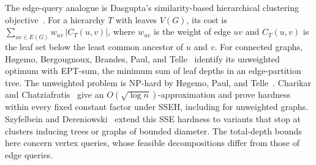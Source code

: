 The edge-query analogue is Dasgupta's similarity-based hierarchical
clustering objective~\cite{Dasgupta2016}. For a hierarchy $T$ with
leaves $V(G)$, its cost is
$\sum_{uv\in E(G)}w_{uv}\,|C_T(u,v)|$,
where $w_{uv}$ is the weight of edge $uv$ and $C_T(u,v)$ is the leaf set below the least common ancestor
of $u$ and $v$. For connected graphs, H\o gemo, Bergougnoux, Brandes,
Paul, and Telle~\cite[Theorem~6]{HogemoEtAl2021} identify its
unweighted optimum with EPT-sum, the minimum sum of leaf depths in an
edge-partition tree. The unweighted problem
is NP-hard by H\o gemo, Paul, and
Telle~\cite{HogemoPaulTelle2020}. Charikar and
Chatziafratis~\cite{CharikarChatziafratis2017} give an
$O(\sqrt{\log n})$-approximation and prove hardness within every
fixed constant factor under SSEH, including for unweighted graphs.
Szyfelbein and Dereniowski~\cite{SzyfelbeinDereniowski2026}
extend this SSE hardness to variants that stop at clusters inducing
trees or graphs of bounded diameter.
The total-depth bounds here concern vertex queries, whose feasible
decompositions differ from those of edge queries.

\clearpage

\clearpage
